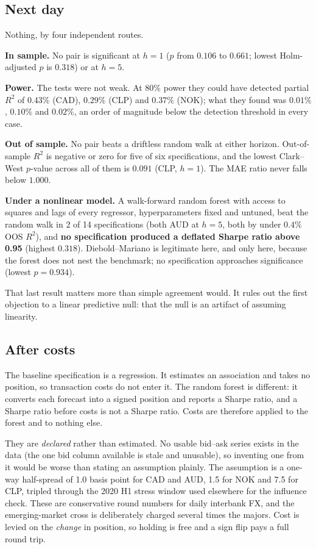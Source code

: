 \documentclass[11pt,a4paper]{article}
\begin{document}
\subsection{Next day}

Nothing, by four independent routes.

\textbf{In sample.} No pair is significant at $h=1$ ($p$ from $0.106$ to
$0.661$; lowest Holm-adjusted $p$ is $0.318$) or at $h=5$.

\textbf{Power.} The tests were not weak. At 80\% power they could have detected
partial $R^2$ of $0.43\%$ (CAD), $0.29\%$ (CLP) and $0.37\%$ (NOK); what they
found was $0.01\%$, $0.10\%$ and $0.02\%$, an order of magnitude below the
detection threshold in every case.

\textbf{Out of sample.} No pair beats a driftless random walk at either horizon.
Out-of-sample $R^2$ is negative or zero for five of six specifications, and the
lowest Clark--West $p$-value across all of them is $0.091$ (CLP, $h=1$). The MAE
ratio never falls below $1.000$.

\textbf{Under a nonlinear model.} A walk-forward random forest with access to
squares and lags of every regressor, hyperparameters fixed and untuned, beat the
random walk in 2 of 14 specifications (both AUD at $h=5$, both by under $0.4\%$
OOS $R^2$), and \textbf{no specification produced a deflated Sharpe ratio above
0.95} (highest $0.318$). Diebold--Mariano is legitimate here, and only here,
because the forest does not nest the benchmark; no specification approaches
significance (lowest $p = 0.934$).

That last result matters more than simple agreement would. It rules out the
first objection to a linear predictive null: that the null is an artifact of
assuming linearity.

\subsection{After costs}
\label{sec:costs}

The baseline specification is a regression. It estimates an association and
takes no position, so transaction costs do not enter it. The random forest is
different: it converts each forecast into a signed position and reports a Sharpe
ratio, and a Sharpe ratio before costs is not a Sharpe ratio. Costs are
therefore applied to the forest and to nothing else.

They are \emph{declared} rather than estimated. No usable bid--ask series exists
in the data (the one bid column available is stale and unusable), so inventing
one from it would be worse than stating an assumption plainly. The assumption is
a one-way half-spread of 1.0 basis point for CAD and AUD, 1.5 for NOK and 7.5
for CLP, tripled through the 2020 H1 stress window used elsewhere for the
influence check. These are conservative round numbers for daily interbank FX,
and the emerging-market cross is deliberately charged several times the majors.
Cost is levied on the \emph{change} in position, so holding is free and a sign
flip pays a full round trip.
\end{document}
